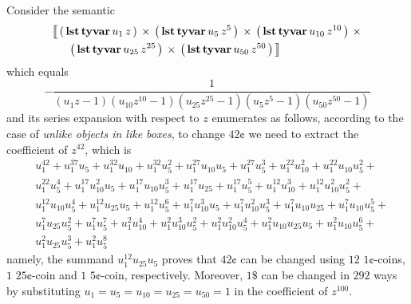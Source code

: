 \begin{example}
Consider the semantic
\begin{displaymath}
\begin{split}
&\semantic{\tycp{\typarens{\tylst{\tyvar{u_{1}\,z}}}}{
            \tycp{\typarens{\tylst{\tyvar{u_{5}\,z^{5}}}}}{
            \tycp{\typarens{\tylst{\tyvar{u_{10}\,z^{10}}}}}{\right.\\
            &\indent\left.\tycp{\typarens{\tylst{\tyvar{u_{25}\,z^{25}}}}}
                  {\typarens{\tylst{\tyvar{u_{50}\,z^{50}}}}}}}}} \\
\end{split}
\end{displaymath}
which equals
\begin{displaymath}
- \frac{1}{\left(u_{1} z - 1\right) \left(u_{10} z^{10} - 1\right) \left(u_{25} z^{25} - 1\right) \left(u_{5} z^{5} - 1\right) \left(u_{50} z^{50} - 1\right)}
\end{displaymath}
and its series expansion with respect to $z$ enumerates as follows,
according to the case of \textit{unlike objects in like boxes}, to change $42¢$ 
we need to extract the coefficient of $z^{42}$, which is
\begin{displaymath}
\begin{split}
&u_{1}^{42} + u_{1}^{37} u_{5} + u_{1}^{32} u_{10} + u_{1}^{32} u_{5}^{2} + u_{1}^{27} u_{10} u_{5} + u_{1}^{27} u_{5}^{3} + u_{1}^{22} u_{10}^{2} + u_{1}^{22} u_{10} u_{5}^{2} + \\
&u_{1}^{22} u_{5}^{4} + u_{1}^{17} u_{10}^{2} u_{5} + u_{1}^{17} u_{10} u_{5}^{3} + u_{1}^{17} u_{25} + u_{1}^{17} u_{5}^{5} + u_{1}^{12} u_{10}^{3} + u_{1}^{12} u_{10}^{2} u_{5}^{2} + \\
&u_{1}^{12} u_{10} u_{5}^{4} + u_{1}^{12} u_{25} u_{5} + u_{1}^{12} u_{5}^{6} + u_{1}^{7} u_{10}^{3} u_{5} + u_{1}^{7} u_{10}^{2} u_{5}^{3} + u_{1}^{7} u_{10} u_{25} + u_{1}^{7} u_{10} u_{5}^{5} + \\
&u_{1}^{7} u_{25} u_{5}^{2} + u_{1}^{7} u_{5}^{7} + u_{1}^{2} u_{10}^{4} + u_{1}^{2} u_{10}^{3} u_{5}^{2} + u_{1}^{2} u_{10}^{2} u_{5}^{4} + u_{1}^{2} u_{10} u_{25} u_{5} + u_{1}^{2} u_{10} u_{5}^{6} + \\
&u_{1}^{2} u_{25} u_{5}^{3} + u_{1}^{2} u_{5}^{8}
\end{split}
\end{displaymath}
namely, the summand $u_{1}^{12} u_{25} u_{5}$ proves that $42¢$ can be changed
using $12$ $1¢$-coins, $1$ $25¢$-coin and $1$ $5¢$-coin, respectively.
Moreover, $1\$$ can be changed in $292$ ways by substituting $u_{1} = u_{5} =
u_{10} = u_{25} = u_{50} = 1$ in the coefficient of $z^{100}$.
\end{example}


